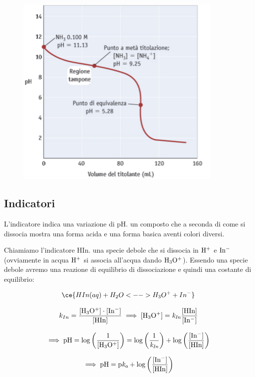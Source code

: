 \begin{figure}[H]
    \centering
    \includegraphics[width=10cm]{immagini/titolazione_base_debole_acido_forte.png}
\end{figure}

\subsection{Indicatori}
L'indicatore indica una variazione di pH. \E un composto che a seconda di come si dissocia mostra una forma acida e una forma basica aventi colori diversi.

Chiamiamo l'indicatore HIn. \E una specie debole che si dissocia in $\rm H^+$ e $\rm In^-$ (ovviamente in acqua $\rm H^+$ si associa all'acqua dando $\rm H_3O^+$). Essendo una specie debole avremo una reazione di equilibrio di dissociazione e quindi una costante di equilibrio:

$$\ce{HIn(aq) + H_2O <--> H_3O^+ + In^-}$$

$$k_{In}=\frac{\rm{[H_3O^+]} \cdot \rm{[In^-]}}{\rm{[HIn]}}\implies \rm{[H_3O^+]}=\textit{k}_{\textit{In}} \frac{\rm{[HIn]}}{\rm{[In^-]}}$$


$$\implies \rm pH = log \left( \frac{1}{[H_3O^+]} \right) = log \left( \frac{1}{\textit{k}_{\textit{In}}} \right) + log \left( \frac{\rm{[In^-]}}{\rm{[HIn]}} \right)$$

$$\implies \rm pH= p\textit{k}_\textit{a} + log \left( \frac{\rm{[In^-]}}{\rm{[HIn]}} \right)$$

